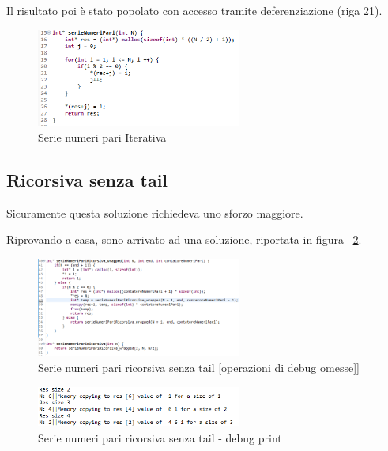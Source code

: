 Il risultato poi è stato popolato con accesso tramite deferenziazione (riga 21).
\begin{figure}[h]
	\centering
	\includegraphics[width=0.6\textwidth]{Immagini/SerieNumeriPariIt.png}
	\caption{Serie numeri pari Iterativa}
	\label{fig:sppIt}
\end{figure}


\subsection{Ricorsiva senza tail}
Sicuramente questa soluzione richiedeva uno sforzo maggiore.

Riprovando a casa, sono arrivato ad una soluzione, riportata in figura ~\ref{fig:sppRecNoTail}.

\begin{figure}[h]
	\centering
	\includegraphics[width=0.6\textwidth]{Immagini/SerieNumeriPariRecNoTail.png}
	\caption{Serie numeri pari ricorsiva senza tail [operazioni di debug omesse]]}
	\label{fig:sppRecNoTail}
\end{figure}

\begin{figure}[h]
	\centering
	\includegraphics[width=0.6\textwidth]{Immagini/SerieNumeriPariRecNoTailDebug.png}
	\caption{Serie numeri pari ricorsiva senza tail - debug print}
	\label{fig:sppRecNoTailLog}
\end{figure}

